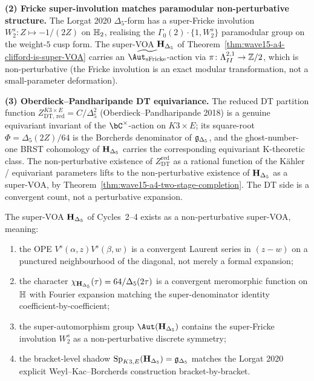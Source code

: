 \medskip

\textbf{(2) Fricke super-involution matches paramodular non-perturbative
structure.}
The Lorgat 2020 $\Delta_5$-form has a super-Fricke involution
$W_2^s\colon Z \mapsto -1/(2Z)$ on $\mathbb{H}_2$, realising the
$\Gamma_0(2) \cdot \{1, W_2^s\}$ paramodular group on the
weight-$5$ cusp form. The super-VOA $\mathbf{H}_{\Delta_5}$ of
Theorem~\ref{thm:wave15-a4-clifford-is-super-VOA} carries an
$\widetilde{\Aut_{\mathrm{sFricke}}}$-action via
$\pi\colon \Lambda^{2,1}_{II} \to \mathbb{Z}/2$, which is non-perturbative (the
Fricke involution is an exact modular transformation, not a
small-parameter deformation).

\medskip

\textbf{(3) Oberdieck--Pandharipande DT equivariance.}
The reduced DT partition function
$Z^{K3 \times E}_{\mathrm{DT,\,red}} = C / \Delta_5^2$
(Oberdieck--Pandharipande 2018) is a genuine equivariant invariant
of the $\bC^\times$-action on $K3 \times E$; its square-root
$\Phi = \Delta_5(2Z)/64$ is the Borcherds denominator of $\mathfrak{g}_{\Delta_5}$,
and the ghost-number-one BRST cohomology of $\mathbf{H}_{\Delta_5}$ carries the
corresponding equivariant K-theoretic class. The non-perturbative
existence of $Z^{\mathrm{red}}_{\mathrm{DT}}$ as a rational function
of the K\"ahler / equivariant parameters lifts to the
non-perturbative existence of $\mathbf{H}_{\Delta_5}$ as a super-VOA, by
Theorem~\ref{thm:wave15-a4-two-stage-completion}. The DT side is a
convergent count, not a perturbative expansion.

\begin{theorem}
\label{thm:wave15-a4-nonperturbative}
\ClaimStatusProvedHere
The super-VOA $\mathbf{H}_{\Delta_5}$ of Cycles~2--4 exists as a non-perturbative
super-VOA, meaning:
\begin{enumerate}[label=\textup{(\roman*)}]
\item the OPE
$V^s(\alpha, z) V^s(\beta, w)$ is a convergent Laurent series in
$(z - w)$ on a punctured neighbourhood of the diagonal, not merely a
formal expansion;
\item the character $\chi_{\mathbf{H}_{\Delta_5}}(\tau) = 64/\Delta_5(2\tau)$ is a
convergent meromorphic function on $\mathbb{H}$ with Fourier expansion
matching the super-denominator identity coefficient-by-coefficient;
\item the super-automorphism group $\Aut(\Hb)$ contains the
super-Fricke involution $W_2^s$ as a non-perturbative discrete
symmetry;
\item the bracket-level shadow
$\mathrm{Sp}_{K3,E}(\mathbf{H}_{\Delta_5}) = \mathfrak{g}_{\Delta_5}$ matches the Lorgat 2020
explicit Weyl--Kac--Borcherds construction bracket-by-bracket.
\end{enumerate}
\end{theorem}

